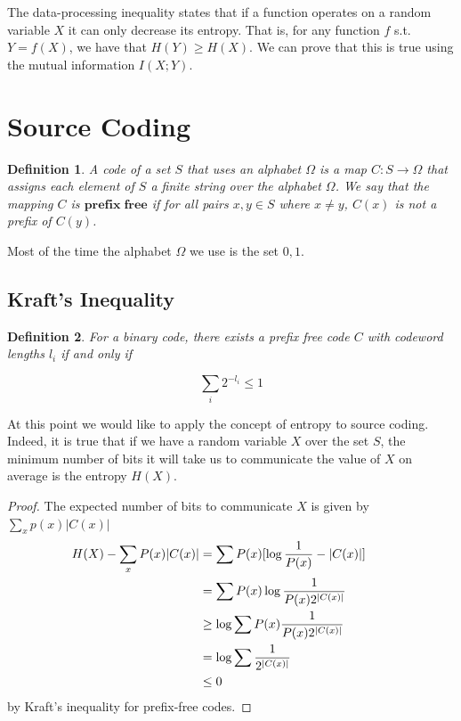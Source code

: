 \documentclass[a4paper,11pt]{book}
\newtheorem{definition}{Definition}
\begin{document}
The data-processing inequality states that if a function operates on a random variable $X$ it can only decrease its entropy. That is, for any function $f$ s.t. $Y= f(X)$, we have that $H(Y) \geq H(X)$. We can prove that this is true using the mutual information $I(X;Y)$.

\section{Source Coding}

\begin{definition}
A code of a set $S$ that uses an alphabet $\Omega$ is a map $C: S\rightarrow \Omega$ that assigns each element of $S$ a finite string over the alphabet $\Omega$. We say that the mapping $C$ is $\mathbf{prefix \; free}$ if for all pairs $x,y \in S$ where $x \neq y$, $C(x)$ is not a prefix of $C(y)$.
\end{definition}

Most of the time the alphabet $\Omega$ we use is the set $0,1$.

\subsection{Kraft's Inequality}

\begin{definition}
For a binary code, there exists a prefix free code $C$ with codeword lengths $l_{i}$ if and only if
\end{definition}

\begin{equation}
\sum_{i} 2^{-l_{i}} \leq 1
\end{equation}

At this point we would like to apply the concept of entropy to source coding. Indeed, it is true that if we have a random variable $X$ over the set $S$, the minimum number of bits it will take us to communicate the value of $X$ on average is the entropy $H(X)$.

\begin{proof}
  The expected number of bits to communicate $X$ is given by $\sum_{x}p(x)|C(x)|$
  \begin{align*}
    H(X) - \sum_{x}P(x)|C(x)| &= \sum P(x)[\log\frac{1}{P(x)} - |C(x)|] \\
    &= \sum P(x)\log\frac{1}{P(x)2^{|C(x)|}} \\
    &\geq \log\sum P(x)\frac{1}{P(x)2^{|C(x)|}}  \\
    &= \log\sum \frac{1}{2^{|C(x)|}}  \\
    &\leq 0 &&\qedhere
  \end{align*}
  by Kraft's inequality for prefix-free codes.
\end{proof}
\end{document}
